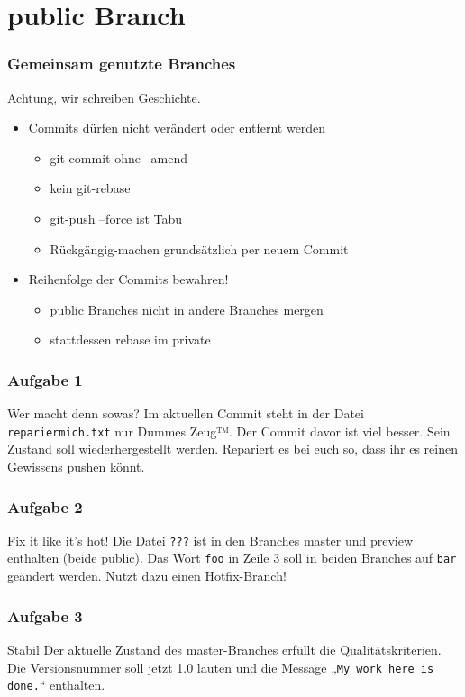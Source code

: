 \documentclass{beamer}
\begin{document}
\section{public Branch}

\begin{frame}
	\frametitle{Gemeinsam genutzte Branches}
	\begin{block}{Achtung, wir schreiben Geschichte.}
		\begin{itemize}
			\item Commits dürfen nicht verändert oder entfernt werden
				\begin{itemize}
					\item git-commit ohne --amend
					\item kein git-rebase
					\item git-push --force ist Tabu
					\item Rückgängig-machen grundsätzlich per neuem Commit
				\end{itemize}
			\item Reihenfolge der Commits bewahren!
				\begin{itemize}
					\item public Branches nicht in andere Branches mergen
					\item stattdessen rebase im private
				\end{itemize}
		\end{itemize}
	\end{block}
\end{frame}

\begin{frame}
	\frametitle{Aufgabe 1}
	\begin{block}{Wer macht denn sowas?}
		Im aktuellen Commit steht in der Datei \texttt{repariermich.txt} nur Dummes Zeug™.
		Der Commit davor ist viel besser.
		Sein Zustand soll wiederhergestellt werden.
		Repariert es bei euch so, dass ihr es reinen Gewissens pushen könnt.
	\end{block}
\end{frame}

\begin{frame}
	\frametitle{Aufgabe 2}
	\begin{block}{Fix it like it’s hot!}
		Die Datei \texttt{???} ist in den Branches master und preview enthalten (beide public).
		Das Wort \texttt{foo} in Zeile 3 soll in beiden Branches auf \texttt{bar} geändert werden.
		Nutzt dazu einen Hotfix-Branch!
	\end{block}
\end{frame}

\begin{frame}
	\frametitle{Aufgabe 3}
	\begin{block}{Stabil}
		Der aktuelle Zustand des master-Branches erfüllt die Qualitätskriterien.
		Die Versionsnummer soll jetzt 1.0 lauten und die Message „\texttt{My work here is done.}“ enthalten.
	\end{block}
\end{frame}
\end{document}
